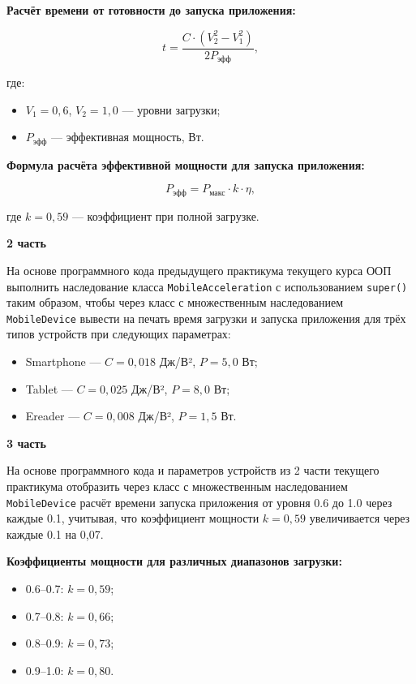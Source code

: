 \begin{enumerate}
\textbf{Расчёт времени от готовности до запуска приложения:}

\begin{equation}
t = \frac{C \cdot (V_2^2 - V_1^2)}{2P_{\text{эфф}}},
\end{equation}

где:  
\begin{itemize}
    \item $V_1 = 0{,}6$, $V_2 = 1{,}0$ — уровни загрузки;  
    \item $P_{\text{эфф}}$ — эффективная мощность, Вт.  
\end{itemize}

\textbf{Формула расчёта эффективной мощности для запуска приложения:}

\begin{equation}
P_{\text{эфф}} = P_{\text{макс}} \cdot k \cdot \eta,
\end{equation}

где $k = 0{,}59$ — коэффициент при полной загрузке.

\textbf{2 часть}

На основе программного кода предыдущего практикума текущего курса ООП выполнить наследование класса \texttt{MobileAcceleration} с использованием \texttt{super()} таким образом, чтобы через класс с множественным наследованием \texttt{MobileDevice} вывести на печать время загрузки и запуска приложения для трёх типов устройств при следующих параметрах:

\begin{itemize}
    \item Smartphone — $C = 0{,}018$ Дж/В², $P = 5{,}0$ Вт;  
    \item Tablet — $C = 0{,}025$ Дж/В², $P = 8{,}0$ Вт;  
    \item Ereader — $C = 0{,}008$ Дж/В², $P = 1{,}5$ Вт.  
\end{itemize}

\textbf{3 часть}

На основе программного кода и параметров устройств из 2 части текущего практикума отобразить через класс с множественным наследованием \texttt{MobileDevice} расчёт времени запуска приложения от уровня 0.6 до 1.0 через каждые 0.1, учитывая, что коэффициент мощности $k = 0{,}59$ увеличивается через каждые 0.1 на 0{,}07.

\textbf{Коэффициенты мощности для различных диапазонов загрузки:}
\begin{itemize}
    \item 0.6–0.7: $k = 0{,}59$;  
    \item 0.7–0.8: $k = 0{,}66$;  
    \item 0.8–0.9: $k = 0{,}73$;  
    \item 0.9–1.0: $k = 0{,}80$.  
\end{itemize}



\end{enumerate}
